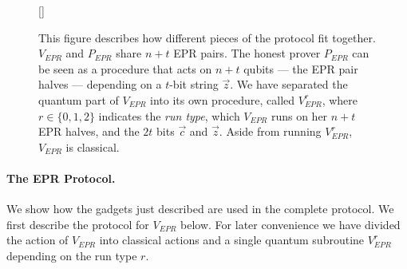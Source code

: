 \begin{figure}[t]
[\FBwidth]
{
  
}
{\caption{This figure describes how different pieces of the protocol fit together. $V_{EPR}$ and $P_{EPR}$ share $n+t$ EPR pairs. The honest prover $P_{EPR}$ can be seen as a procedure that acts on $n+t$ qubits --- the EPR pair halves --- depending on a $t$-bit string $\vec{z}$.  We have separated the quantum part of $V_{EPR}$ into its own procedure, called $V_{EPR}^{r}$, where $r\in\{0,1,2\}$ indicates the \emph{run type}, which $V_{EPR}$ runs on her $n+t$ EPR halves, and the $2t$ bits $\vec{c}$ and $\vec{z}$. Aside from running $V_{EPR}^r$, $V_{EPR}$ is classical. }\label{fig:EPR-high-level}}
\end{figure}



\paragraph{The EPR Protocol.} We show how the gadgets just described are used in the complete protocol. We first describe the protocol for $V_{EPR}$ below.  For later convenience we have divided the action of $V_{EPR}$ into classical actions and a single quantum subroutine $V_{EPR}^r$ depending on the run type $r$. 

